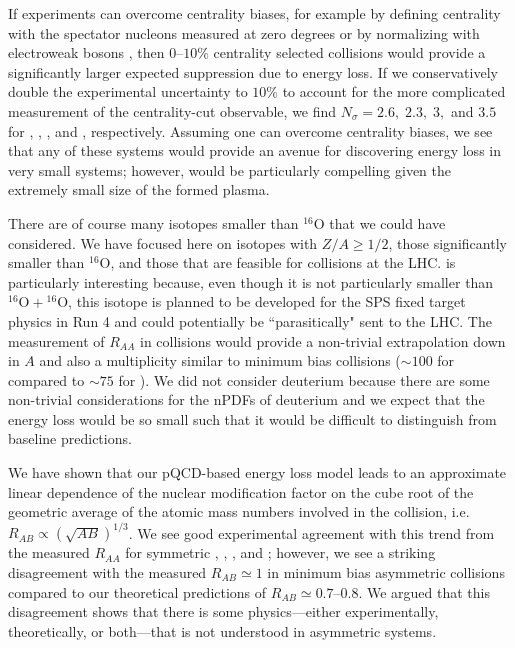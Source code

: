 \documentclass[%
 reprint,
 amsmath,amssymb,
 aps,
 prl,nofootinbib,
 superscriptaddress
]{revtex4-2}
\begin{document}
If experiments can overcome centrality biases, for example by defining centrality with the spectator nucleons measured at zero degrees \cite{ALICE:2014xsp} %
or by normalizing with electroweak bosons \cite{PHENIX:2023dxl}, then $0\text{--}10\%$ centrality selected collisions would provide a significantly larger expected suppression due to energy loss. If we conservatively double the experimental uncertainty to $10\%$ to account for the more complicated measurement of the centrality-cut observable, we find $N_{\sigma} = 2.6, \; 2.3, \; 3, $ and $3.5$ for , , \lili, and \btbt, respectively. Assuming one can overcome centrality biases, we see that any of these systems would provide an avenue for discovering energy loss in very small systems; however,  would be particularly compelling given the extremely small size of the formed plasma.


There are of course many isotopes smaller than ${}^{16}\mathrm{O}$ that we could have considered. We have focused here on isotopes with $Z / A \geq 1 / 2$, those significantly smaller than ${}^{16} \mathrm{O}$, and those that are feasible for collisions at the LHC. \btbt{} is particularly interesting because, even though it is not particularly smaller than ${}^{16} \mathrm{O} + {}^{16} \mathrm{O}$, this isotope is planned to be developed for the SPS fixed target physics in Run 4 and could potentially be ``parasitically" sent to the LHC.
The measurement of $R_{AA}$ in \btbt{} collisions would provide a non-trivial extrapolation down in $A$ and also a multiplicity similar to minimum bias \ppb{} collisions ($\sim 100$ for \btbt{} compared to $\sim 75$ for \ppb).
We did not consider deuterium because there are some non-trivial considerations for the nPDFs of deuterium \cite{Eskola:2021nhw} and we expect that the energy loss would be so small such that it would be difficult to distinguish from baseline predictions.







 We have shown that our pQCD-based energy loss model leads to an approximate linear dependence of the nuclear modification factor on the cube root of the geometric average of the atomic mass numbers involved in the collision, i.e.\ $R_{AB} \propto (\sqrt{AB})^{1 / 3}$. We see good experimental agreement with this trend from the measured $R_{AA}$ for symmetric \pbpb, \xexe, \nene, and \oo; however, we see a striking disagreement with the measured $R_{AB} \simeq 1$  in minimum bias asymmetric \pdha{} collisions compared to our theoretical predictions of $R_{AB} \simeq 0.7\text{--}0.8$. We argued that this disagreement shows that there is some physics---either experimentally, theoretically, or both---that is not understood in asymmetric systems. 
\end{document}
